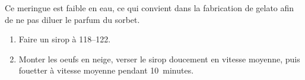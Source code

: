 \label{label:meringue-italienne-gelato}

\begin{ingredients}
\end{ingredients}

Ce meringue est faible en eau, ce qui convient dans la fabrication de
gelato afin de ne pas diluer le parfum du sorbet.

\begin{recipe}
  \begin{enumerate}

  \item Faire un sirop à 118--122\degreeC.

  \item Monter les oeufs en neige, verser le sirop doucement en
    vitesse moyenne, puis fouetter à vitesse moyenne pendant
    10~minutes.

  \end{enumerate}
\end{recipe}

